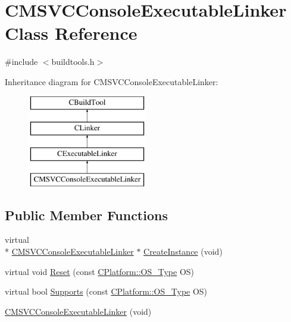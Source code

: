 \hypertarget{classCMSVCConsoleExecutableLinker}{\section{C\-M\-S\-V\-C\-Console\-Executable\-Linker Class Reference}
\label{classCMSVCConsoleExecutableLinker}
}


{\ttfamily \#include $<$buildtools.\-h$>$}

Inheritance diagram for C\-M\-S\-V\-C\-Console\-Executable\-Linker\-:\begin{figure}[H]
\begin{center}
\leavevmode
\includegraphics[height=4.000000cm]{de/d4f/classCMSVCConsoleExecutableLinker}
\end{center}
\end{figure}
\subsection*{Public Member Functions}
\begin{DoxyCompactItemize}
\item 
virtual \\*
\hyperlink{classCMSVCConsoleExecutableLinker}{C\-M\-S\-V\-C\-Console\-Executable\-Linker} $\ast$ \hyperlink{classCMSVCConsoleExecutableLinker_a9240460d8f7ea9651177279bf0640a88}{Create\-Instance} (void)
\item 
virtual void \hyperlink{classCMSVCConsoleExecutableLinker_a79315457d3dfc639a33e60426a67e956}{Reset} (const \hyperlink{classCPlatform_a2fb735c63c53052f79629e338bb0f535}{C\-Platform\-::\-O\-S\-\_\-\-Type} O\-S)
\item 
virtual bool \hyperlink{classCMSVCConsoleExecutableLinker_aaa950dd28c23862008a977f416505592}{Supports} (const \hyperlink{classCPlatform_a2fb735c63c53052f79629e338bb0f535}{C\-Platform\-::\-O\-S\-\_\-\-Type} O\-S)
\item 
\hyperlink{classCMSVCConsoleExecutableLinker_a57abdf0ee82a2f43e6ebfec9b57122ed}{C\-M\-S\-V\-C\-Console\-Executable\-Linker} (void)
\end{DoxyCompactItemize}
